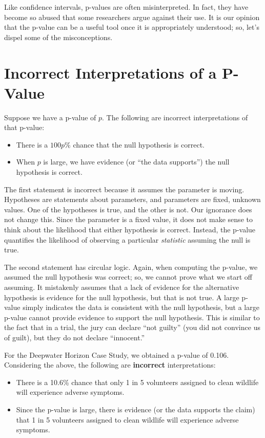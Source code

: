 \documentclass[
  letterpaper,
  DIV=11,
  numbers=noendperiod]{scrreprt}
\providecommand{\tightlist}{%
  \setlength{\itemsep}{0pt}\setlength{\parskip}{0pt}}\usepackage{longtable,booktabs,array}
\theoremstyle{definition}
\theoremstyle{definition}
\theoremstyle{plain}
\theoremstyle{remark}
\begin{document}
Like confidence intervals, p-values are often misinterpreted. In fact,
they have become so abused that some researchers argue against their
use. It is our opinion that the p-value can be a useful tool once it is
appropriately understood; so, let's dispel some of the misconceptions.

\section{Incorrect Interpretations of a
P-Value}\label{incorrect-interpretations-of-a-p-value}

Suppose we have a p-value of \(p\). The following are incorrect
interpretations of that p-value:

\begin{itemize}
\tightlist
\item
  There is a \(100p\)\% chance that the null hypothesis is correct.
\item
  When \(p\) is large, we have evidence (or ``the data supports'') the
  null hypothesis is correct.
\end{itemize}

The first statement is incorrect because it assumes the parameter is
moving. Hypotheses are statements about parameters, and parameters are
fixed, unknown values. One of the hypotheses is true, and the other is
not. Our ignorance does not change this. Since the parameter is a fixed
value, it does not make sense to think about the likelihood that either
hypothesis is correct. Instead, the p-value quantifies the likelihood of
observing a particular \emph{statistic} assuming the null is true.

The second statement has circular logic. Again, when computing the
p-value, we assumed the null hypothesis was correct; so, we cannot prove
what we start off assuming. It mistakenly assumes that a lack of
evidence for the alternative hypothesis is evidence for the null
hypothesis, but that is not true. A large p-value simply indicates the
data is consistent with the null hypothesis, but a large p-value cannot
provide evidence to support the null hypothesis. This is similar to the
fact that in a trial, the jury can declare ``not guilty'' (you did not
convince us of guilt), but they do not declare ``innocent.''

For the Deepwater Horizon Case Study, we obtained a p-value of 0.106.
Considering the above, the following are \textbf{incorrect}
interpretations:

\begin{itemize}
\tightlist
\item
  There is a 10.6\% chance that only 1 in 5 volunteers assigned to clean
  wildlife will experience adverse symptoms.
\item
  Since the p-value is large, there is evidence (or the data supports
  the claim) that 1 in 5 volunteers assigned to clean wildlife will
  experience adverse symptoms.
\end{itemize}
\end{document}

